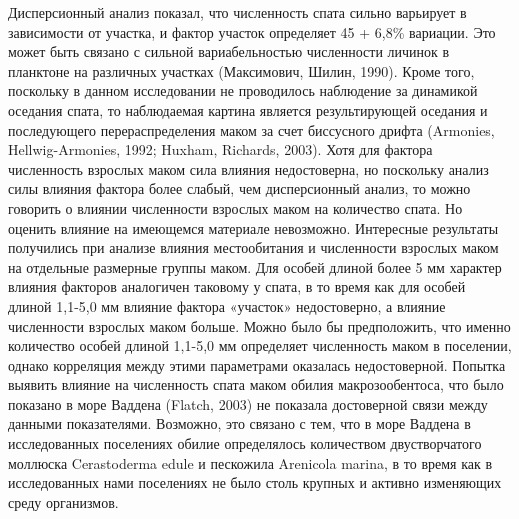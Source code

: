 Дисперсионный анализ показал, что численность спата сильно варьирует в зависимости от участка, и фактор участок определяет 45 + 6,8\% вариации. Это может быть связано с сильной вариабельностью численности личинок в планктоне на различных участках (Максимович, Шилин, 1990). Кроме того, поскольку в данном исследовании не проводилось наблюдение за динамикой оседания спата, то наблюдаемая картина является результирующей оседания и последующего перераспределения маком за счет биссусного дрифта (Armonies, Hellwig-Armonies, 1992; Huxham, Richards, 2003).
Хотя для фактора численность взрослых маком сила влияния недостоверна, но поскольку анализ силы влияния фактора более слабый, чем дисперсионный анализ, то можно говорить о влиянии численности взрослых маком на количество спата. Но оценить влияние на имеющемся материале невозможно.
Интересные результаты получились при анализе влияния местообитания и численности взрослых маком на отдельные размерные группы маком. Для особей длиной более 5 мм характер влияния факторов аналогичен таковому у спата, в то время как для особей длиной 1,1-5,0 мм влияние фактора «участок» недостоверно, а влияние численности взрослых маком больше. Можно было бы предположить, что именно количество особей длиной 1,1-5,0 мм определяет численность маком в поселении, однако корреляция между этими параметрами оказалась недостоверной.
Попытка выявить влияние на численность спата маком обилия макрозообентоса, что было показано в море Ваддена (Flatch, 2003) не показала достоверной связи между данными показателями. Возможно, это связано с тем, что в море Ваддена в исследованных поселениях обилие определялось количеством двустворчатого моллюска Cerastoderma edule и пескожила Arenicola marina, в то время как в исследованных нами поселениях не было столь крупных и активно изменяющих среду организмов. 
